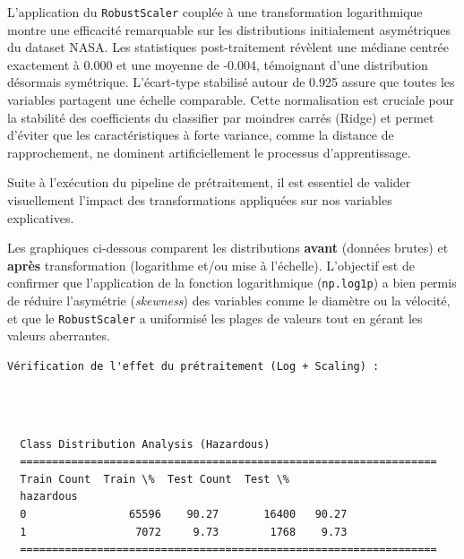 \documentclass[11pt]{article}
\begin{document}
L'application du \texttt{RobustScaler} couplée à une transformation
logarithmique montre une efficacité remarquable sur les distributions
initialement asymétriques du dataset NASA. Les statistiques
post-traitement révèlent une médiane centrée exactement à 0.000 et une
moyenne de -0.004, témoignant d'une distribution désormais symétrique.
L'écart-type stabilisé autour de 0.925 assure que toutes les variables
partagent une échelle comparable. Cette normalisation est cruciale pour
la stabilité des coefficients du classifier par moindres carrés (Ridge)
et permet d'éviter que les caractéristiques à forte variance, comme la
distance de rapprochement, ne dominent artificiellement le processus
d'apprentissage.

Suite à l'exécution du pipeline de prétraitement, il est essentiel de
valider visuellement l'impact des transformations appliquées sur nos
variables explicatives.

Les graphiques ci-dessous comparent les distributions \textbf{avant}
(données brutes) et \textbf{après} transformation (logarithme et/ou mise
à l'échelle). L'objectif est de confirmer que l'application de la
fonction logarithmique (\texttt{np.log1p}) a bien permis de réduire
l'asymétrie (\emph{skewness}) des variables comme le diamètre ou la
vélocité, et que le \texttt{RobustScaler} a uniformisé les plages de
valeurs tout en gérant les valeurs aberrantes.

\begin{Verbatim}[commandchars=\\\{\}]
  Vérification de l'effet du prétraitement (Log + Scaling) :
\end{Verbatim}

\begin{center}
\end{center}
{ \hspace*{\fill} \\}

\begin{Verbatim}[commandchars=\\\{\}]

  Class Distribution Analysis (Hazardous)
  =================================================================
  Train Count  Train \%  Test Count  Test \%
  hazardous
  0                65596    90.27       16400   90.27
  1                 7072     9.73        1768    9.73
  =================================================================
\end{Verbatim}
\end{document}
